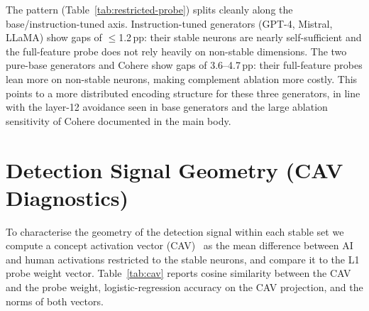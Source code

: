 \documentclass[11pt]{article}
\begin{document}
\begin{table}[!htbp]
\centering
{}
\caption{Restricted probe results. \textit{Smaller model}: L2 probe retrained on only the $|\mathcal{S}^{*}|$ stable neurons. \textit{Gap}: smaller-model accuracy minus ablate-complement accuracy (positive = stable neurons self-sufficient; larger = more dependence on non-stable neurons in the full-feature probe). 15-cell means $\pm$ std.}
\label{tab:restricted-probe}
\end{table}

The pattern (Table~\ref{tab:restricted-probe}) splits cleanly along the base/instruction-tuned axis. Instruction-tuned generators (GPT-4, Mistral, LLaMA) show gaps of $\leq$1.2\,pp: their stable neurons are nearly self-sufficient and the full-feature probe does not rely heavily on non-stable dimensions. The two pure-base generators and Cohere show gaps of 3.6--4.7\,pp: their full-feature probes lean more on non-stable neurons, making complement ablation more costly. This points to a more distributed encoding structure for these three generators, in line with the layer-12 avoidance seen in base generators and the large ablation sensitivity of Cohere documented in the main body.

\section{Detection Signal Geometry (CAV Diagnostics)}
\label{app:cav}

To characterise the geometry of the detection signal within each stable set we compute a concept activation vector (CAV)~\citep{kim2018tcav} as the mean difference between AI and human activations restricted to the stable neurons, and compare it to the L1 probe weight vector. Table~\ref{tab:cav} reports cosine similarity between the CAV and the probe weight, logistic-regression accuracy on the CAV projection, and the norms of both vectors.
\end{document}
